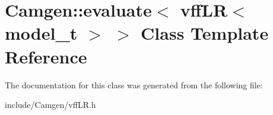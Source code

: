 \hypertarget{a00206}{}\section{Camgen\+:\+:evaluate$<$ vff\+L\+R$<$ model\+\_\+t $>$ $>$ Class Template Reference}
\label{a00206}


The documentation for this class was generated from the following file\+:\begin{DoxyCompactItemize}
\item 
include/\+Camgen/vff\+L\+R.\+h\end{DoxyCompactItemize}
